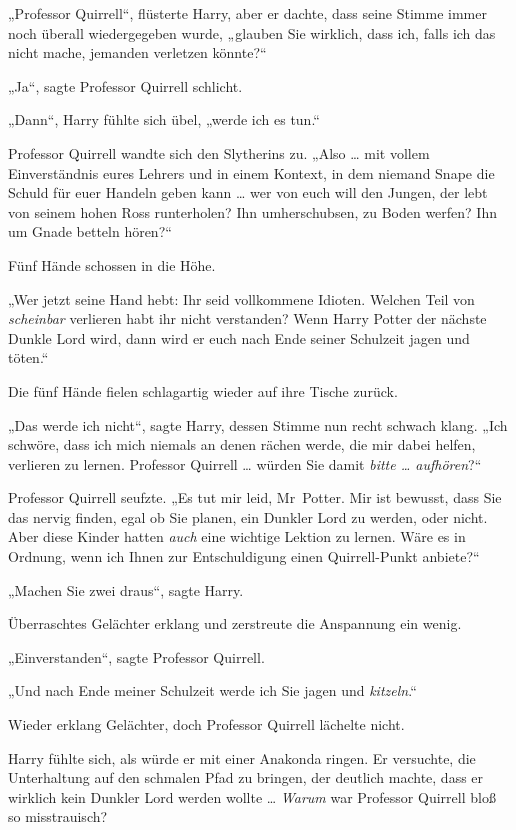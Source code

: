{„Professor Quirrell“, flüsterte Harry, aber er dachte, dass seine Stimme immer noch überall wiedergegeben wurde, „glauben Sie wirklich, dass ich, falls ich das nicht mache, jemanden verletzen könnte?“

„Ja“, sagte Professor Quirrell schlicht.

„Dann“, Harry fühlte sich übel, „werde ich es tun.“

Professor Quirrell wandte sich den Slytherins zu. „Also … mit vollem Einverständnis eures Lehrers und in einem Kontext, in dem niemand Snape die Schuld für euer Handeln geben kann … wer von euch will den Jungen, der lebt von seinem hohen Ross runterholen? Ihn umherschubsen, zu Boden werfen? Ihn um Gnade betteln hören?“

Fünf Hände schossen in die Höhe.

„Wer jetzt seine Hand hebt: Ihr seid vollkommene Idioten. Welchen Teil von \emph{scheinbar} verlieren habt ihr nicht verstanden? Wenn Harry Potter der nächste Dunkle Lord wird, dann wird er euch nach Ende seiner Schulzeit jagen und töten.“

Die fünf Hände fielen schlagartig wieder auf ihre Tische zurück.

„Das werde ich nicht“, sagte Harry, dessen Stimme nun recht schwach klang. „Ich schwöre, dass ich mich niemals an denen rächen werde, die mir dabei helfen, verlieren zu lernen. Professor Quirrell … würden Sie damit \emph{bitte … aufhören}?“

Professor Quirrell seufzte. „Es tut mir leid, Mr~Potter. Mir ist bewusst, dass Sie das nervig finden, egal ob Sie planen, ein Dunkler Lord zu werden, oder nicht. Aber diese Kinder hatten \emph{auch} eine wichtige Lektion zu lernen. Wäre es in Ordnung, wenn ich Ihnen zur Entschuldigung einen Quirrell-Punkt anbiete?“

„Machen Sie zwei draus“, sagte Harry.

Überraschtes Gelächter erklang und zerstreute die Anspannung ein wenig.

„Einverstanden“, sagte Professor Quirrell.

„Und nach Ende meiner Schulzeit werde ich Sie jagen und \emph{kitzeln}.“

Wieder erklang Gelächter, doch Professor Quirrell lächelte nicht.

Harry fühlte sich, als würde er mit einer Anakonda ringen. Er versuchte, die Unterhaltung auf den schmalen Pfad zu bringen, der deutlich machte, dass er wirklich kein Dunkler Lord werden wollte … \emph{Warum} war Professor Quirrell bloß so misstrauisch?

}
